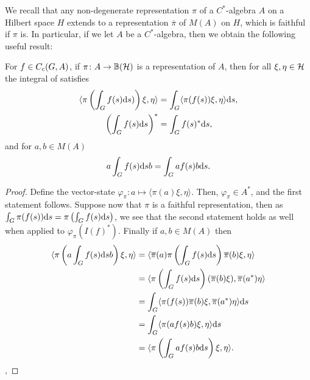We recall that any non-degenerate representation $\pi$ of a $C^*$-algebra $A$ on a Hilbert space $H$ extends to a representation $\overline \pi$ of $M(A)$ on $H$, which is faithful if $\pi$ is. In particular, if we let $A$ be a $C^*$-algebra, then we obtain the following useful result:
\begin{proposition}
For $f \in C_c(G,A)$, if $\pi \colon A \to \mathbb{B}(\mathcal{H})$ is a representation of $A$, then for all $\xi, \eta \in \mathcal{H}$ the integral of  satisfies
\begin{align*}
	\langle \pi\left( \int_G f(s) \mathrm{d} s ) \right) \xi , \eta \rangle &= \int_{G} \langle \pi(f(s)) \xi , \eta \rangle \mathrm{d} s,\\
	\left( \int_G f(s) \mathrm{d} s  \right)^* &= \int_G f(s)^* \mathrm{d} s,
\end{align*}
and for $a , b \in M(A)$
\begin{align*}
 a \int_G f(s) \mathrm{d} s b = \int_G a f(s) b \mathrm{d} s.		
\end{align*}
\label{int:cstarint}
\end{proposition}
\begin{proof}
Define the vector-state $\varphi_\pi \colon a \mapsto \langle \pi(a) \xi , \eta \rangle$. Then, $\varphi_\pi \in A^*$, and the first statement follows. Suppose now that $\pi$ is a faithful representation, then as $\int_G \pi(f(s)) \mathrm{d} s = \pi \left( \int_Gf(s) \mathrm{d} s \right)$, we see that the second statement holds as well when applied to $\varphi_\pi(I(f)^*)$. Finally if $a,b \in M(A)$ then
\begin{align*}
	\langle \pi\left(a \int_G f(s) \mathrm{d} s b \right) \xi , \eta \rangle &= \langle \overline \pi(a) \pi\left( \int_G f(s) \mathrm{d} s \right) \overline \pi (b)  \xi , \eta \rangle \\
	 &= \langle \pi \left( \int_G f(s) \mathrm{d} s \right) (\overline \pi (b) \xi ) , \overline \pi(a^*) \eta \rangle \\ 
	 &= \int_G \langle \pi(f(s)) \overline \pi (b) \xi , \overline \pi(a ^* ) \eta \rangle \mathrm{d} s\\
	 &= \int_G \langle \pi(af(s)b) \xi , \eta \rangle \mathrm{d} s\\
	 &= \langle \pi \left(  \int_G a f(s) b \mathrm{d} s  \right) \xi , \eta \rangle.
\end{align*},
\end{proof}

